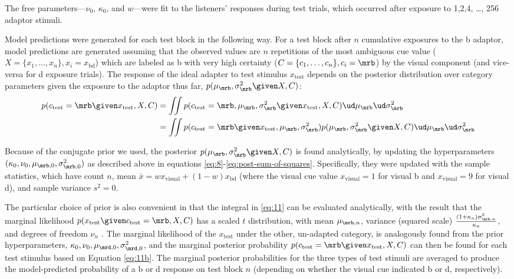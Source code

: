 The free parameters---$\nu_0$, $\kappa_0$, and $w$---were fit to the listeners' responses during test trials, which occurred after exposure to 1,2,4, \ldots, 256 adaptor stimuli.

Model predictions were generated for each test block in the following way.  For a test block after $n$ cumulative exposures to the \ph b adaptor, model predictions are generated assuming that the observed values are $n$ repetitions of the most ambiguous cue value ($X=\{x_1, \ldots, x_n\}, x_i=x_\mathrm{bd}$) which are labeled as \ph b with very high certainty ($C=\{c_1, \ldots, c_n\}, c_i=\mrb$) by the visual component (and vice-versa for \ph d exposure trials).
The response of the ideal adapter to test stimulus $x_\mathrm{test}$ depends on the posterior distribution over category parameters given the exposure to the adaptor thus far, $p(\mu_\mrb, \sigma^2_\mrb \given X, C)$:
\begin{align}
  \label{eq:11}
  p(c_\mathrm{test}=\mrb \given x_\mathrm{test}, X, C) &=   \iint p(c_\mathrm{test}=\mrb, \mu_\mrb, \sigma^2_\mrb \given x_\mathrm{test}, X, C) \ud \mu_\mrb \ud \sigma^2_\mrb \\
  \label{eq:11b} &= \iint p(c_\mathrm{test}=\mrb \given x_\mathrm{test}, \mu_\mrb, \sigma^2_\mrb) p(\mu_\mrb, \sigma^2_\mrb \given X, C) \ud \mu_\mrb \ud \sigma^2_\mrb
\end{align}

Because of the conjugate prior we used, the posterior $p(\mu_\mrb, \sigma^2_\mrb \given X, C)$ is found analytically, by updating the hyperparameters $(\kappa_0, \nu_0, \mu_{\mrb,0}, \sigma^2_{\mrb, 0})$ as described above in equations \eqref{eq:8}-\eqref{eq:post-sum-of-squares}.  Specifically, they were updated with the sample statistics, which have count $n$, mean $\bar x = wx_\mathrm{visual} + (1-w) x_\mathrm{bd}$ (where the visual cue value $x_\mathrm{visual}=1$ for visual \ph b and $x_\mathrm{visual}=9$ for visual \ph d), and sample variance $s^2 = 0$.

The particular choice of prior is also convenient in that the integral in \eqref{eq:11} can be evaluated analytically, with the result that the marginal likelihood $p(x_\mathrm{test} \given c_\mathrm{test} = \mrb, X, C)$ has a scaled $t$ distribution, with mean $\mu_{\mrb, n}$, variance (squared scale) $\frac{(1+\kappa_n) \sigma^2_{\mrb, n}}{\kappa_n}$, and degrees of freedom $\nu_n$ \cite{Gelman2003}.  The marginal likelihood of the $x_\mathrm{test}$ under the other, un-adapted category, is analogously found from the prior hyperparameters, $\kappa_0, \nu_0, \mu_{\mrd, 0}, \sigma^2_{\mrd, 0}$, and the marginal posterior probability $p(c_\mathrm{test}=\mrb \given x_\mathrm{test}, X, C)$ can then be found for each test stimulus based on Equation \ref{eq:11b}.  The marginal posterior probabilities for the three types of test stimuli are averaged to produce the model-predicted probability of a \ph b or \ph d response on test block $n$ (depending on whether the visual cue indicated \ph b or \ph d, respectively).

